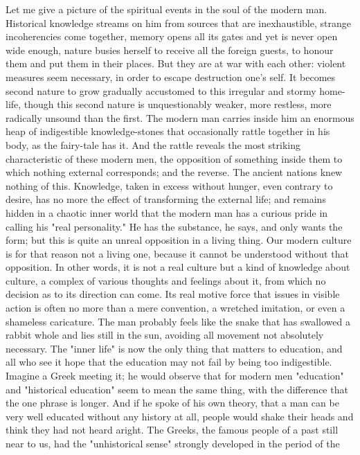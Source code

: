 Let me give a picture of the spiritual events in the soul of the
modern man. Historical knowledge streams on him from sources that are
inexhaustible, strange incoherencies come together, memory opens all
its gates and yet is never open wide enough, nature busies herself to
receive all the foreign guests, to honour them and put them in their
places. But they are at war with each other: violent measures seem
necessary, in order to escape destruction one's self. It becomes
second nature to grow gradually accustomed to this irregular and
stormy home-life, though this second nature is unquestionably weaker,
more restless, more radically unsound than the first. The modern man
carries inside him an enormous heap of indigestible knowledge-stones
that occasionally rattle together in his body, as the fairy-tale has
it. And the rattle reveals the most striking characteristic of these
modern men, the opposition of something inside them to which nothing
external corresponds; and the reverse. The ancient nations knew
nothing of this. Knowledge, taken in excess without hunger, even
contrary to desire, has no more the effect of transforming the
external life; and remains hidden in a chaotic inner world that the
modern man has a curious pride in calling his "real personality." He
has the substance, he says, and only wants the form; but this is
quite an unreal opposition in a living thing. Our modern culture is
for that reason not a living one, because it cannot be understood
without that opposition. In other words, it is not a real culture but
a kind of knowledge about culture, a complex of various thoughts and
feelings about it, from which no decision as to its direction can
come. Its real motive force that issues in visible action is often no
more than a mere convention, a wretched imitation, or even a
shameless caricature. The man probably feels like the snake that has
swallowed a rabbit whole and lies still in the sun, avoiding all
movement not absolutely necessary. The "inner life" is now the only
thing that matters to education, and all who see it hope that the
education may not fail by being too indigestible. Imagine a Greek
meeting it; he would observe that for modern men "education" and
"historical education" seem to mean the same thing, with the
difference that the one phrase is longer. And if he spoke of his own
theory, that a man can be very well educated without any history at
all, people would shake their heads and think they had not heard
aright. The Greeks, the famous people of a past still near to us, had
the "unhistorical sense" strongly developed in the period of the

